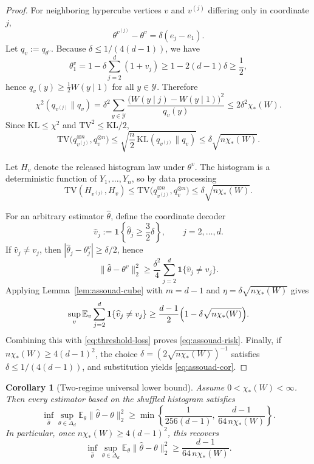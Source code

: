 \documentclass[11pt]{amsart}
\numberwithin{equation}{section}
\newtheorem{corollary}[theorem]{Corollary}
\theoremstyle{definition}
\newcommand{\E}{\mathbb E}
\newcommand{\one}{\mathbf 1}
\newcommand{\TV}{\mathrm{TV}}
\newcommand{\KL}{\mathrm{KL}}
\begin{document}
\begin{proof}
For neighboring hypercube vertices \(v\) and \(v^{(j)}\) differing only in coordinate \(j\),
\[
\theta^{v^{(j)}}-\theta^v=\delta(e_j-e_1).
\]
Let \(q_v:=q_{\theta^v}\).
Because \(\delta\le 1/(4(d-1))\), we have
\[
\theta^v_1
=
1-\delta\sum_{j=2}^d (1+v_j)
\ge
1-2(d-1)\delta
\ge \frac12,
\]
hence \(q_v(y)\ge \frac12 W(y\mid 1)\) for all \(y\in\mathcal Y\).
Therefore
\[
\chi^2(q_{v^{(j)}}\|q_v)
=
\delta^2\sum_{y\in\mathcal Y}
\frac{\bigl(W(y\mid j)-W(y\mid 1)\bigr)^2}{q_v(y)}
\le
2\delta^2\chi_\ast(W). \tag{8.7}\label{eq:assouad-chi}
\]
Since \(\KL\le \chi^2\) and \(\TV^2\le \KL/2\),
\[
\TV\!\bigl(q_{v^{(j)}}^{\otimes n},q_v^{\otimes n}\bigr)
\le
\sqrt{\frac{n}{2}\,\KL(q_{v^{(j)}}\|q_v)}
\le
\delta\sqrt{n\chi_\ast(W)}. \tag{8.8}\label{eq:assouad-tv-product}
\]

Let \(H_v\) denote the released histogram law under \(\theta^v\).
The histogram is a deterministic function of \(Y_1,\dots,Y_n\), so by data processing
\[
\TV(H_{v^{(j)}},H_v)\le
\TV\!\bigl(q_{v^{(j)}}^{\otimes n},q_v^{\otimes n}\bigr)
\le
\delta\sqrt{n\chi_\ast(W)}. \tag{8.9}\label{eq:assouad-tv-hist}
\]

For an arbitrary estimator \(\widehat\theta\), define the coordinate decoder
\[
\widehat v_j:=\one\!\left\{\widehat\theta_j\ge \frac32\delta\right\},
\qquad j=2,\dots,d.
\]
If \(\widehat v_j\neq v_j\), then \(|\widehat\theta_j-\theta^v_j|\ge \delta/2\), hence
\[
\|\widehat\theta-\theta^v\|_2^2
\ge
\frac{\delta^2}{4}\sum_{j=2}^d \one\{\widehat v_j\neq v_j\}. \tag{8.10}\label{eq:threshold-loss}
\]
Applying Lemma~\ref{lem:assouad-cube} with
\(m=d-1\) and
\(\eta=\delta\sqrt{n\chi_\ast(W)}\)
gives
\[
\sup_v \E_v\sum_{j=2}^d \one\{\widehat v_j\neq v_j\}
\ge
\frac{d-1}{2}\Bigl(1-\delta\sqrt{n\chi_\ast(W)}\Bigr).
\]
Combining this with \eqref{eq:threshold-loss} proves \eqref{eq:assouad-risk}.
Finally, if \(n\chi_\ast(W)\ge 4(d-1)^2\), the choice
\(
\delta=(2\sqrt{n\chi_\ast(W)})^{-1}
\)
satisfies
\(
\delta\le 1/(4(d-1))
\),
and substitution yields \eqref{eq:assouad-cor}.
\end{proof}

\begin{corollary}[Two-regime universal lower bound]\label{cor:assouad-two-regime}
Assume \(0<\chi_\ast(W)<\infty\).  Then every estimator based on the shuffled
histogram satisfies
\[
\inf_{\widehat\theta}\sup_{\theta\in\Delta_d}
\E_\theta\|\widehat\theta-\theta\|_2^2
\ge
\min\!\left\{
\frac{1}{256(d-1)},\,
\frac{d-1}{64\,n\chi_\ast(W)}
\right\}.
\]
In particular, once \(n\chi_\ast(W)\ge 4(d-1)^2\), this recovers
\[
\inf_{\widehat\theta}\sup_{\theta\in\Delta_d}
\E_\theta\|\widehat\theta-\theta\|_2^2
\ge
\frac{d-1}{64\,n\chi_\ast(W)}.
\]
\end{corollary}
\end{document}
